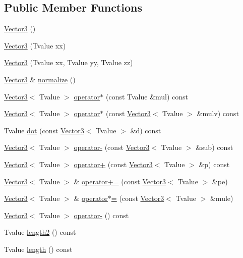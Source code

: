 \subsection*{Public Member Functions}
\begin{DoxyCompactItemize}
\item 
\hyperlink{class_vector3_a1ab223d942be7732183ee116accb4801}{Vector3} ()
\item 
\hyperlink{class_vector3_a3edecc7c83a95dba71584e169ed0af86}{Vector3} (Tvalue xx)
\item 
\hyperlink{class_vector3_a562c9473219f42500d74662244e5c54a}{Vector3} (Tvalue xx, Tvalue yy, Tvalue zz)
\item 
\hyperlink{class_vector3}{Vector3} \& \hyperlink{class_vector3_a88f8d29ec51d966db7c36e2626040cf5}{normalize} ()
\item 
\hyperlink{class_vector3}{Vector3}$<$ Tvalue $>$ \hyperlink{class_vector3_a6f27f180b7dfa13df47fb0d5b53abc94}{operator$\ast$} (const Tvalue \&mul) const
\item 
\hyperlink{class_vector3}{Vector3}$<$ Tvalue $>$ \hyperlink{class_vector3_abf9dfd8150ddce3d68de3a05f359f8c7}{operator$\ast$} (const \hyperlink{class_vector3}{Vector3}$<$ Tvalue $>$ \&mulv) const
\item 
Tvalue \hyperlink{class_vector3_a800b81a6260784ccc20ab127833c969c}{dot} (const \hyperlink{class_vector3}{Vector3}$<$ Tvalue $>$ \&d) const
\item 
\hyperlink{class_vector3}{Vector3}$<$ Tvalue $>$ \hyperlink{class_vector3_a1ffdb538fbdeb746c34d10ccb0481691}{operator-\/} (const \hyperlink{class_vector3}{Vector3}$<$ Tvalue $>$ \&sub) const
\item 
\hyperlink{class_vector3}{Vector3}$<$ Tvalue $>$ \hyperlink{class_vector3_a69f0cdbed5fc093183e07fcc89a23136}{operator+} (const \hyperlink{class_vector3}{Vector3}$<$ Tvalue $>$ \&p) const
\item 
\hyperlink{class_vector3}{Vector3}$<$ Tvalue $>$ \& \hyperlink{class_vector3_a3e7c9473344707d60601964a20d73089}{operator+=} (const \hyperlink{class_vector3}{Vector3}$<$ Tvalue $>$ \&pe)
\item 
\hyperlink{class_vector3}{Vector3}$<$ Tvalue $>$ \& \hyperlink{class_vector3_a9e935ee74a6f8b917767b867cfa74a5d}{operator$\ast$=} (const \hyperlink{class_vector3}{Vector3}$<$ Tvalue $>$ \&mule)
\item 
\hyperlink{class_vector3}{Vector3}$<$ Tvalue $>$ \hyperlink{class_vector3_a40dd7f0f2060b7ace809dd64fe768a35}{operator-\/} () const
\item 
Tvalue \hyperlink{class_vector3_a8d6f6aa9d499d65f7e32bb88f1442aef}{length2} () const
\item 
Tvalue \hyperlink{class_vector3_a193a8d533eec9444459626e6c4faee2d}{length} () const
\end{DoxyCompactItemize}
